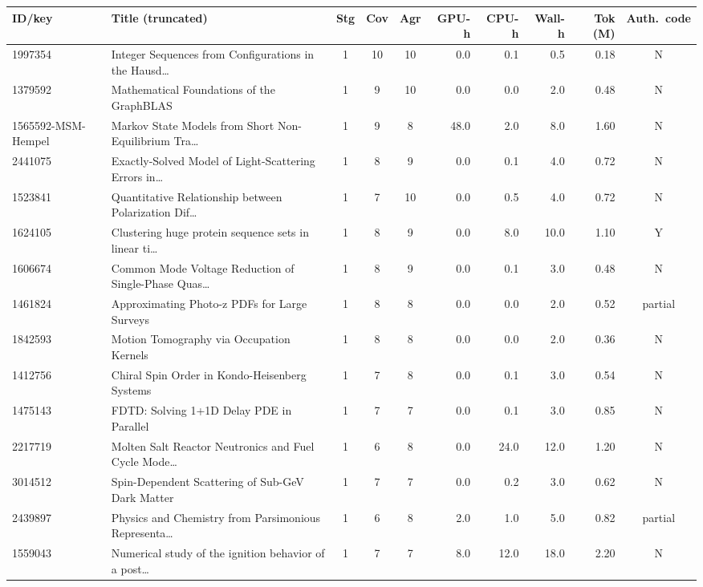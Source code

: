 \documentclass[11pt,letterpaper]{article}
\begin{document}
\begin{landscape}
\renewcommand{\arraystretch}{1.05}
\footnotesize
\begin{longtable}{p{2.6cm}p{6.0cm}c c c r r r r c}
\toprule
\textbf{ID/key} & \textbf{Title (truncated)} & \textbf{Stg} & \textbf{Cov} & \textbf{Agr} & \textbf{GPU-h} & \textbf{CPU-h} & \textbf{Wall-h} & \textbf{Tok (M)} & \textbf{Auth.\ code} \\
\midrule
\endhead
1997354 & Integer Sequences from Configurations in the Hausd… & 1 & 10 & 10 & 0.0 & 0.1 & 0.5 & 0.18 & N \\
1379592 & Mathematical Foundations of the GraphBLAS & 1 & 9 & 10 & 0.0 & 0.0 & 2.0 & 0.48 & N \\
1565592-MSM-Hempel & Markov State Models from Short Non-Equilibrium Tra… & 1 & 9 & 8 & 48.0 & 2.0 & 8.0 & 1.60 & N \\
2441075 & Exactly-Solved Model of Light-Scattering Errors in… & 1 & 8 & 9 & 0.0 & 0.1 & 4.0 & 0.72 & N \\
1523841 & Quantitative Relationship between Polarization Dif… & 1 & 7 & 10 & 0.0 & 0.5 & 4.0 & 0.72 & N \\
1624105 & Clustering huge protein sequence sets in linear ti… & 1 & 8 & 9 & 0.0 & 8.0 & 10.0 & 1.10 & Y \\
1606674 & Common Mode Voltage Reduction of Single-Phase Quas… & 1 & 8 & 9 & 0.0 & 0.1 & 3.0 & 0.48 & N \\
1461824 & Approximating Photo-z PDFs for Large Surveys & 1 & 8 & 8 & 0.0 & 0.0 & 2.0 & 0.52 & partial \\
1842593 & Motion Tomography via Occupation Kernels & 1 & 8 & 8 & 0.0 & 0.0 & 2.0 & 0.36 & N \\
1412756 & Chiral Spin Order in Kondo-Heisenberg Systems & 1 & 7 & 8 & 0.0 & 0.1 & 3.0 & 0.54 & N \\
1475143 & FDTD: Solving 1+1D Delay PDE in Parallel & 1 & 7 & 7 & 0.0 & 0.1 & 3.0 & 0.85 & N \\
2217719 & Molten Salt Reactor Neutronics and Fuel Cycle Mode… & 1 & 6 & 8 & 0.0 & 24.0 & 12.0 & 1.20 & N \\
3014512 & Spin-Dependent Scattering of Sub-GeV Dark Matter & 1 & 7 & 7 & 0.0 & 0.2 & 3.0 & 0.62 & N \\
2439897 & Physics and Chemistry from Parsimonious Representa… & 1 & 6 & 8 & 2.0 & 1.0 & 5.0 & 0.82 & partial \\
1559043 & Numerical study of the ignition behavior of a post… & 1 & 7 & 7 & 8.0 & 12.0 & 18.0 & 2.20 & N \\

\end{longtable}
\end{landscape}
\end{document}
